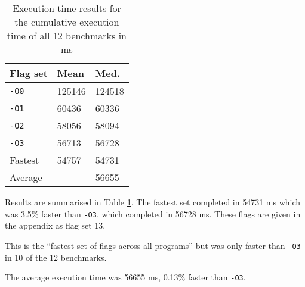 \documentclass[twocolumn, 10pt]{article}
\begin{document}
\begin{table}[H]
    \centering
    \begin{tabular}{lll}
        \toprule
        Flag set & Mean & Med. \\
        \midrule
        \texttt{-O0} &125146&124518 \\
        \texttt{-O1} &60436&60336 \\
        \texttt{-O2} &58056&58094 \\
        \texttt{-O3} &56713&56728 \\
        Fastest &54757&54731  \\
        Average &-&56655\\
        \bottomrule
    \end{tabular}
    \caption{Execution time results for the cumulative execution time of all 12 benchmarks in ms}
    \label{tab:ov}
\end{table}
Results are summarised in Table \ref{tab:ov}.
The fastest set completed in 54731 ms which was 3.5\% faster than \texttt{-O3}, which completed in 56728 ms.
These flags are given in the appendix as flag set 13.

This is the ``fastest set of flags across all programs'' but was only faster than \texttt{-O3} in 10 of the 12 benchmarks.

The average execution time was 56655 ms, 0.13\% faster than \texttt{-O3}.
\end{document}
